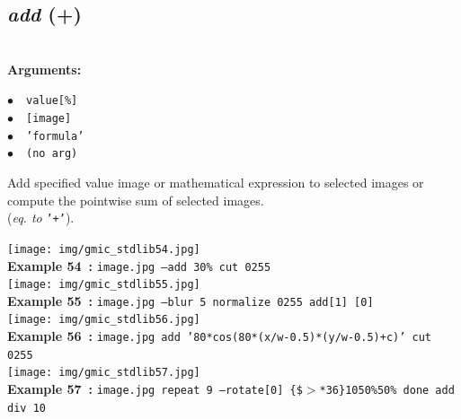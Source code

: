 \documentclass[a4paper,10.5pt,twoside]{book}
\def\comma{\discretionary{,}{}{,}}
\newcommand{\Cb}[1]{\textcolor{cb}{#1}}
\begin{document}
\subsection{\emph{add} (+)}\vspace*{-0.7em}
~\\\textbf{\Cb{Arguments: }}\begin{flushleft}
{\small \Cb{\hspace*{0.5cm}$\bullet$~~\texttt{value[\%]}}}~~~\\
{\small \Cb{\hspace*{0.5cm}$\bullet$~~\texttt{[image]}}}~~~\\
{\small \Cb{\hspace*{0.5cm}$\bullet$~~\texttt{'formula'}}}~~~\\
{\small \Cb{\hspace*{0.5cm}$\bullet$~~\texttt{(no arg)}}}\end{flushleft}
Add specified value{\comma} image or mathematical expression to selected images{\comma}
or compute the pointwise sum of selected images.
~\\(\emph{eq. to} {\small \texttt{'+'}}).
\begin{center}\texttt{[image: img/gmic\_stdlib54.jpg]}\\
{\footnotesize \textbf{Example 54~:} \texttt{image.jpg --add 30\% cut 0{\comma}255}}
\\\texttt{[image: img/gmic\_stdlib55.jpg]}\\
{\footnotesize \textbf{Example 55~:} \texttt{image.jpg --blur 5 normalize 0{\comma}255 add[1] [0]}}
\\\texttt{[image: img/gmic\_stdlib56.jpg]}\\
{\footnotesize \textbf{Example 56~:} \texttt{image.jpg add '80*cos(80*(x/w-0.5)*(y/w-0.5)+c)' cut 0{\comma}255}}
\\\texttt{[image: img/gmic\_stdlib57.jpg]}\\
{\footnotesize \textbf{Example 57~:} \texttt{image.jpg repeat 9 --rotate[0] \{\$$>$*36\}{\comma}1{\comma}0{\comma}50\%{\comma}50\% done add div 10}}
\end{center}
\end{document}
